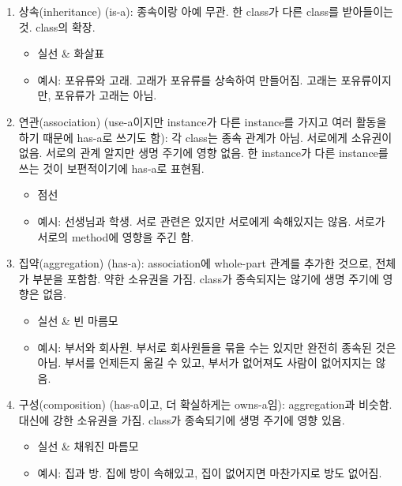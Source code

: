 \begin{enumerate}
\def\labelenumi{\arabic{enumi}.}
\tightlist
\item
  상속(inheritance) (is-a): 종속이랑 아예 무관. 한 class가 다른 class를
  받아들이는 것. class의 확장.

  \begin{itemize}
  \tightlist
  \item
    실선 \& 화살표
  \item
    예시: 포유류와 고래. 고래가 포유류를 상속하여 만들어짐. 고래는
    포유류이지만, 포유류가 고래는 아님.
  \end{itemize}
\item
  연관(association) (use-a이지만 instance가 다른 instance를 가지고 여러
  활동을 하기 때문에 has-a로 쓰기도 함): 각 class는 종속 관계가 아님.
  서로에게 소유권이 없음. 서로의 관계 알지만 생명 주기에 영향 없음. 한
  instance가 다른 instance를 쓰는 것이 보편적이기에 has-a로 표현됨.

  \begin{itemize}
  \tightlist
  \item
    점선
  \item
    예시: 선생님과 학생. 서로 관련은 있지만 서로에게 속해있지는 않음.
    서로가 서로의 method에 영향을 주긴 함.
  \end{itemize}
\item
  집약(aggregation) (has-a): association에 whole-part 관계를 추가한
  것으로, 전체가 부분을 포함함. 약한 소유권을 가짐. class가 종속되지는
  않기에 생명 주기에 영향은 없음.

  \begin{itemize}
  \tightlist
  \item
    실선 \& 빈 마름모
  \item
    예시: 부서와 회사원. 부서로 회사원들을 묶을 수는 있지만 완전히
    종속된 것은 아님. 부서를 언제든지 옮길 수 있고, 부서가 없어져도
    사람이 없어지지는 않음.
  \end{itemize}
\item
  구성(composition) (has-a이고, 더 확실하게는 owns-a임): aggregation과
  비슷함. 대신에 강한 소유권을 가짐. class가 종속되기에 생명 주기에 영향
  있음.

  \begin{itemize}
  \tightlist
  \item
    실선 \& 채워진 마름모
  \item
    예시: 집과 방. 집에 방이 속해있고, 집이 없어지면 마찬가지로 방도
    없어짐.
  \end{itemize}
\end{enumerate}

